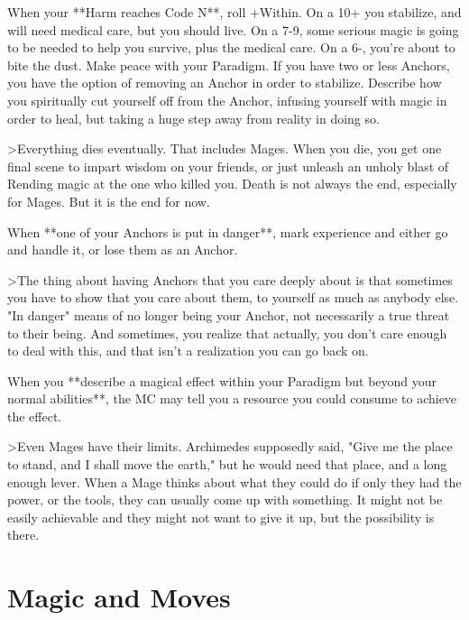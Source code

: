 \documentclass[
  oneside,
  statementpaper,
  9pt]{memoir}
\begin{document}
\begin{Player}
When your **Harm reaches Code N**, roll +Within. On a 10+ you stabilize, and will need medical care, but you should live. On a 7-9, some serious magic is going to be needed to help you survive, plus the medical care. On a 6-, you’re about to bite the dust. Make peace with your Paradigm. If you have two or less Anchors, you have the option of removing an Anchor in order to stabilize. Describe how you spiritually cut yourself off from the Anchor, infusing yourself with magic in order to heal, but taking a huge step away from reality in doing so.

>Everything dies eventually. That includes Mages. When you die, you get one final scene to impart wisdom on your friends, or just unleash an unholy blast of Rending magic at the one who killed you. Death is not always the end, especially for Mages. But it is the end for now.

When **one of your Anchors is put in danger**, mark experience and either go and handle it, or lose them as an Anchor.

>The thing about having Anchors that you care deeply about is that sometimes you have to show that you care about them, to yourself as much as anybody else. "In danger" means of no longer being your Anchor, not necessarily a true threat to their being. And sometimes, you realize that actually, you don’t care enough to deal with this, and that isn’t a realization you can go back on.

When you **describe a magical effect within your Paradigm but beyond your normal abilities**, the MC may tell you a resource you could consume to achieve the effect.

>Even Mages have their limits. Archimedes supposedly said, "Give me the place to stand, and I shall move the earth," but he would need that place, and a long enough lever. When a Mage thinks about what they could do if only they had the power, or the tools, they can usually come up with something. It might not be easily achievable and they might not want to give it up, but the possibility is there.

\end{Player}

\hypertarget{magic-and-moves}{%
\section{Magic and Moves}\label{magic-and-moves}}
\end{document}
